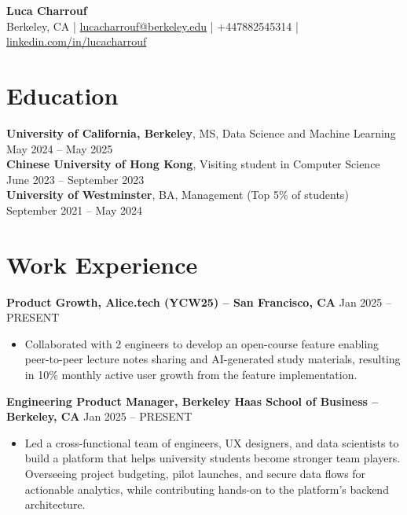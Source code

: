 \documentclass{article}
\begin{document}
\noindent
\textbf{\Large Luca Charrouf} \\
\noindent
Berkeley, CA | \href{mailto:lucacharrouf@berkeley.edu}{lucacharrouf@berkeley.edu} | +447882545314 | \href{https://linkedin.com/in/lucacharrouf}{linkedin.com/in/lucacharrouf}

\section*{Education}
\noindent
\textbf{University of California, Berkeley}, MS, Data Science and Machine Learning \hfill May 2024 -- May 2025 \\
\textbf{Chinese University of Hong Kong}, Visiting student in Computer Science \hfill June 2023 -- September 2023 \\
\textbf{University of Westminster}, BA, Management (Top 5\% of students) \hfill September 2021 -- May 2024

\section*{Work Experience}
\noindent
\textbf{Product Growth, Alice.tech (YCW25) -- San Francisco, CA} \hfill Jan 2025 -- PRESENT
\begin{itemize}[leftmargin=*,noitemsep,topsep=0pt]
    \item Collaborated with 2 engineers to develop an open-course feature enabling peer-to-peer lecture notes sharing and AI-generated study materials, resulting in 10\% monthly active user growth from the feature implementation.
\end{itemize}

\noindent
\textbf{Engineering Product Manager, Berkeley Haas School of Business -- Berkeley, CA} \hfill Jan 2025 -- PRESENT
\begin{itemize}[leftmargin=*,noitemsep,topsep=0pt]
    \item Led a cross-functional team of engineers, UX designers, and data scientists to build a platform that helps university students become stronger team players. Overseeing project budgeting, pilot launches, and secure data flows for actionable analytics, while contributing hands-on to the platform's backend architecture.
\end{itemize}
\end{document}
